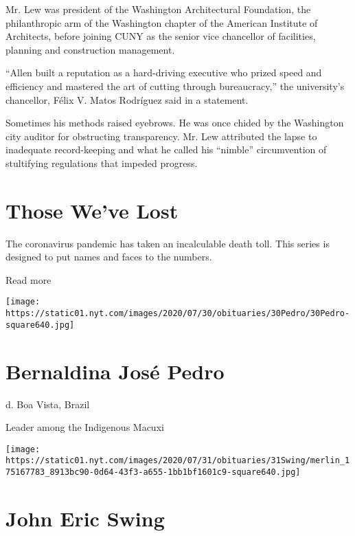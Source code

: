 Mr. Lew was president of the Washington Architectural Foundation, the
philanthropic arm of the Washington chapter of the American Institute of
Architects, before joining CUNY as the senior vice chancellor of
facilities, planning and construction management.

``Allen built a reputation as a hard-driving executive who prized speed
and efficiency and mastered the art of cutting through bureaucracy,''
the university's chancellor, Félix V. Matos Rodríguez said in a
statement.

Sometimes his methods raised eyebrows. He was once chided by the
Washington city auditor for obstructing transparency. Mr. Lew attributed
the lapse to inadequate record-keeping and what he called his ``nimble''
circumvention of stultifying regulations that impeded progress.

\href{https://www.nytimes.com/interactive/2020/obituaries/people-died-coronavirus-obituaries.html?action=click\&pgtype=Article\&state=default\&region=BELOW_MAIN_CONTENT\&context=covid_obits_promo}{}

\hypertarget{those-weve-lost}{%
\section{Those We've Lost}\label{those-weve-lost}}

The coronavirus pandemic has taken an incalculable death toll. This
series is designed to put names and faces to the numbers.

Read more

\texttt{[image: https://static01.nyt.com/images/2020/07/30/obituaries/30Pedro/30Pedro-square640.jpg]}

\hypertarget{bernaldina-josuxe9-pedro}{%
\section{Bernaldina José Pedro}\label{bernaldina-josuxe9-pedro}}

d. Boa Vista, Brazil

Leader among the Indigenous Macuxi

\texttt{[image: https://static01.nyt.com/images/2020/07/31/obituaries/31Swing/merlin\_175167783\_8913bc90-0d64-43f3-a655-1bb1bf1601c9-square640.jpg]}

\hypertarget{john-eric-swing}{%
\section{John Eric Swing}\label{john-eric-swing}}

